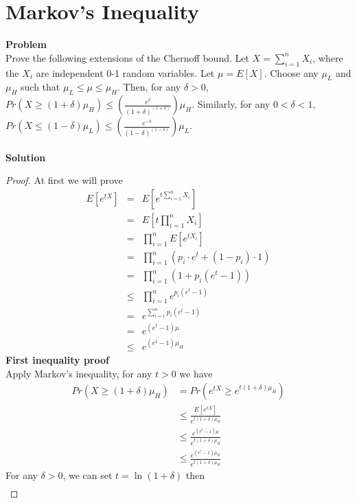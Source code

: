 \section{Markov's Inequality} 
\textbf{Problem}\\
Prove the following extensions of the Chernoff bound. Let $X=\sum_{i=1}^{n} X_i$, where the $X_i$ are independent 0-1 random variables. Let $\mu = E[X]$. Choose any $\mu_L$ and $\mu_H$ such that $\mu_L \le \mu \le \mu_H$. Then, for any $\delta > 0$, $Pr(X \ge (1+\delta) \mu_H) \le (\frac{e^\delta}{(1+\delta)^{(1+\delta)}}) \mu_H$.
Similarly, for any $0 < \delta < 1$, $Pr(X \le (1-\delta) \mu_L) \le (\frac{e^{-\delta}}{(1-\delta)^{(1-\delta)}}) \mu_L$.\\\\
\textbf{Solution}\\
\begin{proof}
	At first we will prove
\begin{eqnarray*}
	E[e^{tX}]
	&=& E\left[e^{t\sum_{i=1}^{n}X_i} \right]\\
	&=& E \left[t \prod_{i=1}^{n}X_i \right]\\
	&=& \prod_{i=1}^{n}E \left[e^{tX_i} \right]\\
	&=& \prod_{i=1}^{n}\left(p_i\cdot e^t +(1-p_i)\cdot 1 \right)\\
	&=& \prod_{i=1}^{n}(1+p_i(e^t-1))\\
	&\leq& \prod_{i=1}^{n}e^{p_i(e^t-1)}\\
	&=& e^{\sum_{i=1}^{n}p_i(e^t-1)}\\
	&=& e^{(e^t-1)\mu}\\
	&\leq& e^{(e^t-1)\mu_H}
\end{eqnarray*}
\textbf{First inequality proof}\\
Apply Markov's inequality, for any $t>0$ we have
\begin{equation*}
\begin{split}
Pr\left(X \ge (1+\delta) \mu_H\right) &= Pr\left(e^{tX} \ge e^{t(1+\delta)\mu_H}\right)\\
&\le \frac{E[e^{tX}]}{e^{t(1+\delta)\mu_H}} \\
&\le \frac{e^{(e^t-1)\mu}}{e^{t(1+\delta)\mu_H}} \\
&\le \frac{e^{(e^t-1)\mu_H}}{e^{t(1+\delta)\mu_H}}
\end{split}
\end{equation*}
For any $\delta>0$, we can set $t=\ln(1+\delta)$ then
\begin{equation*}
\begin{split}

\end{split}
\end{equation*}
\end{proof}
